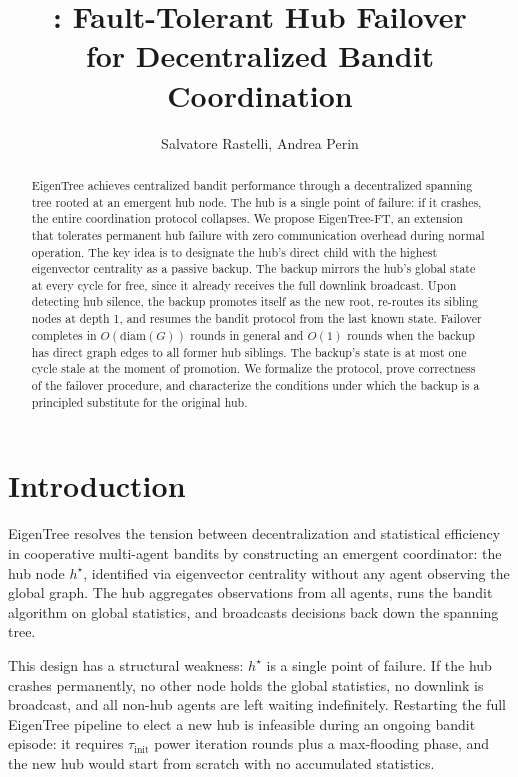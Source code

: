 \documentclass{article}
\title{\merwft: Fault-Tolerant Hub Failover\\for Decentralized Bandit Coordination}
\author{Salvatore Rastelli, Andrea Perin}
\date{}
\newcommand{\merw}{EigenTree}
\newcommand{\merwft}{EigenTree-FT}
\begin{document}
\maketitle

\begin{abstract}
    \merw{} achieves centralized bandit performance through a decentralized spanning tree
    rooted at an emergent hub node. The hub is a single point of failure: if it crashes,
    the entire coordination protocol collapses. We propose \merwft, an extension that
    tolerates permanent hub failure with zero communication overhead during normal
    operation. The key idea is to designate the hub's direct child with the highest
    eigenvector centrality as a passive backup. The backup mirrors the hub's global state at every
    cycle for free, since it already receives the full downlink broadcast. Upon detecting
    hub silence, the backup promotes itself as the new root, re-routes its sibling nodes
    at depth 1, and resumes the bandit protocol from the last known state. Failover
    completes in $O(\mathrm{diam}(G))$ rounds in general and $O(1)$ rounds when the
    backup has direct graph edges to all former hub siblings. The backup's state is at
    most one cycle stale at the moment of promotion. We formalize the protocol, prove
    correctness of the failover procedure, and characterize the conditions under which the
    backup is a principled substitute for the original hub.
\end{abstract}

\section{Introduction}

\merw{} resolves the tension between decentralization and statistical efficiency in
cooperative multi-agent bandits by constructing an emergent coordinator: the hub node
$h^\star$, identified via eigenvector centrality without any agent observing the
global graph. The hub aggregates observations from all agents, runs the bandit algorithm
on global statistics, and broadcasts decisions back down the spanning tree.

This design has a structural weakness: $h^\star$ is a single point of failure. If the hub
crashes permanently, no other node holds the global statistics, no downlink is broadcast,
and all non-hub agents are left waiting indefinitely. Restarting the full \merw{} pipeline
to elect a new hub is infeasible during an ongoing bandit episode: it requires
$\tau_{\mathrm{init}}$ power iteration rounds plus a max-flooding phase, and the new hub
would start from scratch with no accumulated statistics.
\end{document}
